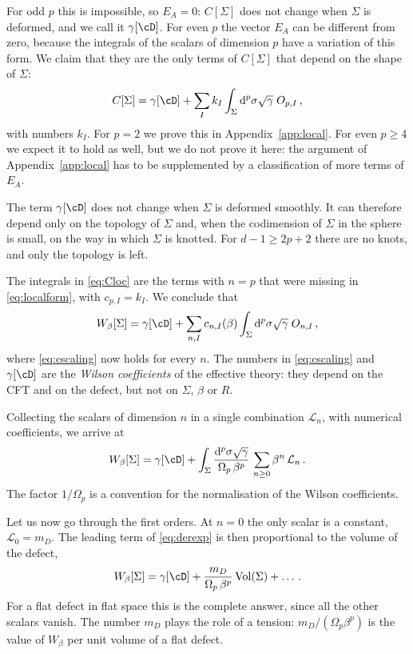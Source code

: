 \documentclass[a4paper,11pt]{article}
\newcommand{\dd}{\mathrm{d}}
\begin{document}
For odd $p$ this is impossible, so $E_A=0$: $C[\Sigma]$ does not change when $\Sigma$ is deformed, and we call it $\gamma[\cD]$. For even $p$ the vector $E_A$ can be different from zero, because the integrals of the scalars of dimension $p$ have a variation of this form. We claim that they are the only terms of $C[\Sigma]$ that depend on the shape of $\Sigma$:
\begin{equation}\label{eq:Cloc}
	C[\Sigma]=\gamma[\cD]+\sum_I k_I\int_\Sigma\dd^p\sigma\sqrt\gamma\;O_{p,I}\, ,
\end{equation}
with numbers $k_I$. For $p=2$ we prove this in Appendix~\ref{app:local}. For even $p\ge4$ we expect it to hold as well, but we do not prove it here: the argument of Appendix~\ref{app:local} has to be supplemented by a classification of more terms of $E_A$.

The term $\gamma[\cD]$ does not change when $\Sigma$ is deformed smoothly. It can therefore depend only on the topology of $\Sigma$ and, when the codimension of $\Sigma$ in the sphere is small, on the way in which $\Sigma$ is knotted. For $d-1\geq 2p+2$ there are no knots, and only the topology is left.

The integrals in \eqref{eq:Cloc} are the terms with $n=p$ that were missing in \eqref{eq:localform}, with $c_{p,I}=k_I$. We conclude that
\begin{equation}\label{eq:Wloc2}
	W_\beta[\Sigma]=\gamma[\cD]+\sum_{n,I}c_{n,I}(\beta)\int_\Sigma\dd^p\sigma\sqrt\gamma\;O_{n,I}\, ,
\end{equation}
where \eqref{eq:cscaling} now holds for every $n$. The numbers in \eqref{eq:cscaling} and $\gamma[\cD]$ are the \emph{Wilson coefficients} of the effective theory: they depend on the CFT and on the defect, but not on $\Sigma$, $\beta$ or $R$.

Collecting the scalars of dimension $n$ in a single combination $\mathcal{L}_n$, with numerical coefficients, we arrive at
\begin{equation}\label{eq:derexp}
	W_\beta[\Sigma]=\gamma[\cD]+\int_\Sigma \frac{\dd^p\sigma\sqrt{\gamma}}{\Omega_p\,\beta^{p}}\,\sum_{n\ge0}\beta^{n}\,\mathcal{L}_n \, .
\end{equation}
The factor $1/\Omega_p$ is a convention for the normalisation of the Wilson coefficients.


Let us now go through the first orders. At $n=0$ the only scalar is a constant, $\mathcal{L}_0=m_D$. The leading term of \eqref{eq:derexp} is then proportional to the volume of the defect,
\begin{equation}
	W_\beta[\Sigma]=\gamma[\cD]+\frac{m_D}{\Omega_p\,\beta^{p}}\,\mathrm{Vol}(\Sigma)+\dots\, .
\end{equation}
For a flat defect in flat space this is the complete answer, since all the other scalars vanish. The number $m_D$ plays the role of a tension: $m_D/(\Omega_p\beta^p)$ is the value of $W_\beta$ per unit volume of a flat defect.
\end{document}
